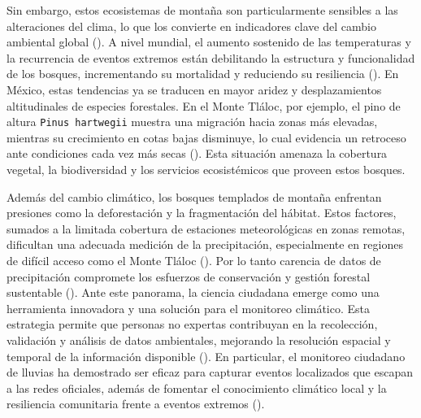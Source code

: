 

Sin embargo, estos ecosistemas de montaña son particularmente sensibles a las alteraciones del clima, lo que los convierte en indicadores clave del cambio ambiental global (\cite{beniston2003climatic}). A nivel mundial, el aumento sostenido de las temperaturas y la recurrencia de eventos extremos están debilitando la estructura y funcionalidad de los bosques, incrementando su mortalidad y reduciendo su resiliencia (\cite{Allen2010}). En México, estas tendencias ya se traducen en mayor aridez y desplazamientos altitudinales de especies forestales. En el Monte Tláloc, por ejemplo, el pino de altura \texttt{Pinus hartwegii} muestra una migración hacia zonas más elevadas, mientras su crecimiento en cotas bajas disminuye, lo cual evidencia un retroceso ante condiciones cada vez más secas (\cite{Astudillo2017}). Esta situación amenaza la cobertura vegetal, la biodiversidad y los servicios ecosistémicos que proveen estos bosques.

Además del cambio climático, los bosques templados de montaña enfrentan presiones como la deforestación y la fragmentación del hábitat. Estos factores, sumados a la limitada cobertura de estaciones meteorológicas en zonas remotas, dificultan una adecuada medición de la precipitación, especialmente en regiones de difícil acceso como el Monte Tláloc (\cite{aparicio1992}). Por lo tanto carencia de datos de precipitación compromete los esfuerzos de conservación y gestión forestal sustentable (\cite{hernandez2021}).
Ante este panorama, la ciencia ciudadana emerge como una herramienta innovadora y una solución para el monitoreo climático. Esta estrategia permite que personas no expertas contribuyan en la recolección, validación y análisis de datos ambientales, mejorando la resolución espacial y temporal de la información disponible (\cite{csic_ciencia_ciudadana, viegas2023citizen, elmore2014mping, lei2022combining}). En particular, el monitoreo ciudadano de lluvias ha demostrado ser eficaz para capturar eventos localizados que escapan a las redes oficiales, además de fomentar el conocimiento climático local y la resiliencia comunitaria frente a eventos extremos (\cite{okada2019community, ciga_monitoreo}).


